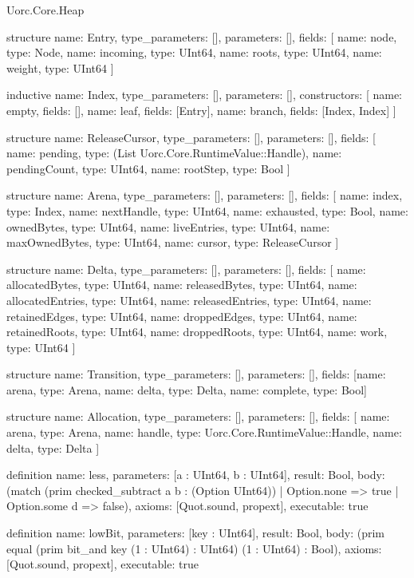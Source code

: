 \begin{lexlean}{Uorc.Core.Heap}
\begin{semanticmodule}
structure{
  name: Entry,
  type_parameters: [],
  parameters: [],
  fields: [
    {name: node, type: Node},
    {name: incoming, type: UInt64},
    {name: roots, type: UInt64},
    {name: weight, type: UInt64}
  ]
}

inductive{
  name: Index,
  type_parameters: [],
  parameters: [],
  constructors: [
    {name: empty, fields: []},
    {name: leaf, fields: [Entry]},
    {name: branch, fields: [Index, Index]}
  ]
}

structure{
  name: ReleaseCursor,
  type_parameters: [],
  parameters: [],
  fields: [
    {name: pending, type: (List Uorc.Core.RuntimeValue::Handle)},
    {name: pendingCount, type: UInt64},
    {name: rootStep, type: Bool}
  ]
}

structure{
  name: Arena,
  type_parameters: [],
  parameters: [],
  fields: [
    {name: index, type: Index},
    {name: nextHandle, type: UInt64},
    {name: exhausted, type: Bool},
    {name: ownedBytes, type: UInt64},
    {name: liveEntries, type: UInt64},
    {name: maxOwnedBytes, type: UInt64},
    {name: cursor, type: ReleaseCursor}
  ]
}

structure{
  name: Delta,
  type_parameters: [],
  parameters: [],
  fields: [
    {name: allocatedBytes, type: UInt64},
    {name: releasedBytes, type: UInt64},
    {name: allocatedEntries, type: UInt64},
    {name: releasedEntries, type: UInt64},
    {name: retainedEdges, type: UInt64},
    {name: droppedEdges, type: UInt64},
    {name: retainedRoots, type: UInt64},
    {name: droppedRoots, type: UInt64},
    {name: work, type: UInt64}
  ]
}

structure{
  name: Transition,
  type_parameters: [],
  parameters: [],
  fields: [{name: arena, type: Arena}, {name: delta, type: Delta}, {name: complete, type: Bool}]
}

structure{
  name: Allocation,
  type_parameters: [],
  parameters: [],
  fields: [
    {name: arena, type: Arena},
    {name: handle, type: Uorc.Core.RuntimeValue::Handle},
    {name: delta, type: Delta}
  ]
}

definition{
  name: less,
  parameters: [a : UInt64, b : UInt64],
  result: Bool,
  body: (match (prim checked_subtract a b : (Option UInt64))
    | Option.none => true
    | Option.some d => false),
  axioms: [Quot.sound, propext],
  executable: true
}

definition{
  name: lowBit,
  parameters: [key : UInt64],
  result: Bool,
  body: (prim equal (prim bit_and key (1 : UInt64) : UInt64) (1 : UInt64) : Bool),
  axioms: [Quot.sound, propext],
  executable: true
}


\end{semanticmodule}
\end{lexlean}
